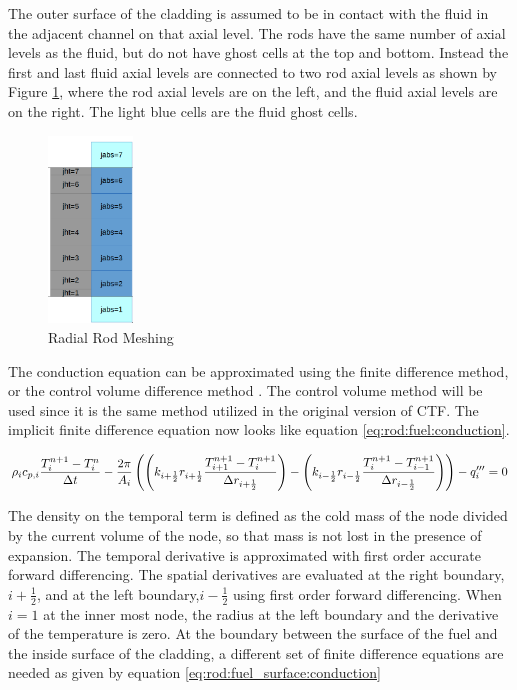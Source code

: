 The outer surface of the cladding is assumed to be in contact with the fluid in
the  adjacent channel on that axial level. The rods have the same number of
axial  levels as the fluid, but do not have ghost cells at the top and bottom.
Instead  the first and last fluid axial levels are connected to two rod axial
levels as  shown by Figure \ref{fig:fluid-solid-meshing}, where the rod axial
levels are on the left, and the fluid  axial levels are on the right. The light
blue cells are the fluid ghost cells.

	\begin{figure}[!h]
		\centering
		\includegraphics[width=0.20\textwidth]{images/fluid-solid-meshing.png}
		\caption{Radial Rod Meshing}
		\label{fig:fluid-solid-meshing}
	\end{figure}

The conduction equation can be approximated using the finite difference method,
or the control volume difference method \cite{Botte2000}. The control volume
method will be used  since it is the same method utilized in the original
version of CTF. The implicit  finite difference equation now looks like equation
\ref{eq:rod:fuel:conduction}.

\begin{equation}
	\small
	\label{eq:rod:fuel:conduction}
	  \rho_{i}c_{p,i}\frac{T^{n+1}_{i}-T^{n}_{i}}{\Delta t}
	- \frac{2\pi}{A_{i}}\left( 
		\left(k_{i+\frac{1}{2}}r_{i+\frac{1}{2}}
		\frac{T^{n+1}_{i+1}-T^{n+1}_{i}}{\Delta r_{i+\frac{1}{2}}}\right)
 	  - \left(k_{i-\frac{1}{2}}r_{i-\frac{1}{2}}
		\frac{T^{n+1}_{i}-T^{n+1}_{i-1}}{\Delta r_{i-\frac{1}{2}}}\right)
	  \right)
	- q_{i}'''
	= 0
\end{equation}

The density on the temporal term is defined as the cold mass of the node divided
by the current volume of the node, so that mass is not lost in the presence of
expansion. The temporal derivative is approximated with first order accurate
forward differencing. The spatial derivatives are evaluated at the right
boundary, $i+\frac{1}{2}$, and at the left boundary,$i-\frac{1}{2}$ using first
order forward differencing. When $i=1$ at the inner most node, the radius at the
left boundary and the derivative of the temperature is zero. At the boundary
between the surface of the fuel and the inside surface of the cladding, a
different set of finite difference equations are needed as given by equation
\ref{eq:rod:fuel_surface:conduction}

